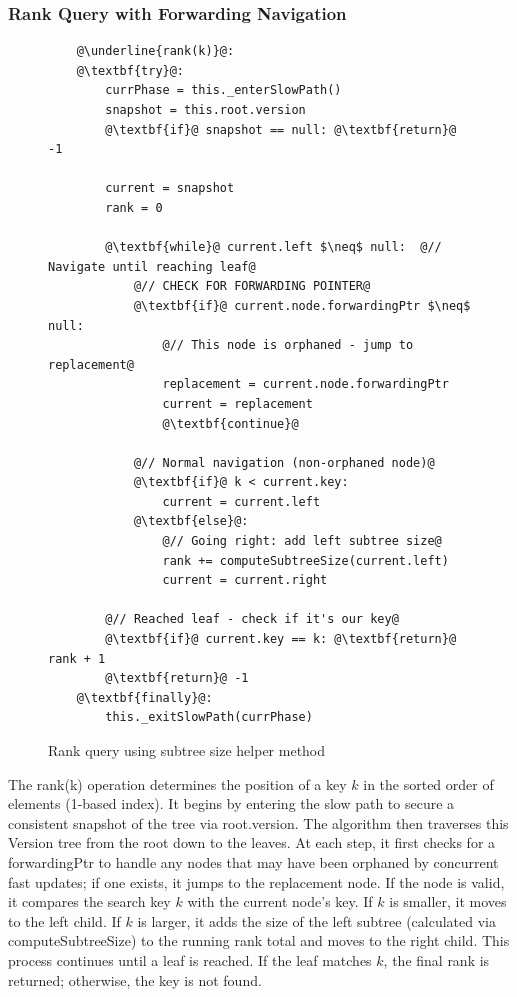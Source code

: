 \documentclass[acmsmall,screen,nonacm]{acmart}
\newcommand{\codestyle}[1]{{{\fontsize{9}{10}\ttfamily #1}}}
\begin{document}
\subsubsection{Rank Query with Forwarding Navigation}

\begin{figure}[H]
\begin{lstlisting}
    @\underline{rank(k)}@:
    @\textbf{try}@:
        currPhase = this._enterSlowPath()
        snapshot = this.root.version
        @\textbf{if}@ snapshot == null: @\textbf{return}@ -1
        
        current = snapshot
        rank = 0
        
        @\textbf{while}@ current.left $\neq$ null:  @// Navigate until reaching leaf@
            @// CHECK FOR FORWARDING POINTER@
            @\textbf{if}@ current.node.forwardingPtr $\neq$ null:
                @// This node is orphaned - jump to replacement@
                replacement = current.node.forwardingPtr
                current = replacement
                @\textbf{continue}@
            
            @// Normal navigation (non-orphaned node)@
            @\textbf{if}@ k < current.key:
                current = current.left
            @\textbf{else}@:
                @// Going right: add left subtree size@
                rank += computeSubtreeSize(current.left)
                current = current.right
        
        @// Reached leaf - check if it's our key@
        @\textbf{if}@ current.key == k: @\textbf{return}@ rank + 1
        @\textbf{return}@ -1
    @\textbf{finally}@:
        this._exitSlowPath(currPhase)
\end{lstlisting}
\caption{Rank query using subtree size helper method}
\label{fig:rank-with-forwarding}
\end{figure}

The \codestyle{rank(k)} operation determines the position of a key $k$ in the sorted order of elements (1-based index). It begins by entering the slow path to secure a consistent snapshot of the tree via \codestyle{root.version}. The algorithm then traverses this Version tree from the root down to the leaves. At each step, it first checks for a \codestyle{forwardingPtr} to handle any nodes that may have been orphaned by concurrent fast updates; if one exists, it jumps to the replacement node. If the node is valid, it compares the search key $k$ with the current node's key. If $k$ is smaller, it moves to the left child. If $k$ is larger, it adds the size of the left subtree (calculated via \codestyle{computeSubtreeSize}) to the running rank total and moves to the right child. This process continues until a leaf is reached. If the leaf matches $k$, the final rank is returned; otherwise, the key is not found.
\end{document}
